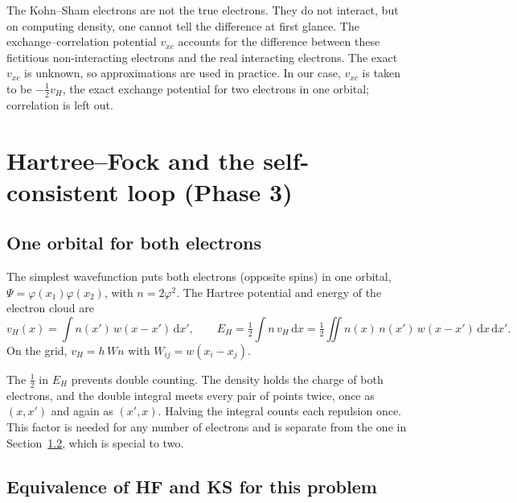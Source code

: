 \documentclass[11pt,a4paper]{article}
\newcommand{\dd}{\,\mathrm{d}}
\begin{document}
\begin{Note}
The Kohn--Sham electrons are not the true electrons. They do not interact, but on computing density, one cannot tell the difference at first glance.
The exchange--correlation potential $v_{xc}$ accounts for the difference between these fictitious non-interacting electrons and the real interacting
electrons. The exact $v_{xc}$ is unknown, so approximations are used in practice. In our case, $v_{xc}$ is taken to be $-\tfrac12v_H$, the exact
exchange potential for two electrons in one orbital; correlation is left out.
\end{Note}

\section{Hartree--Fock and the self-consistent loop (Phase 3)}

\subsection{One orbital for both electrons}

The simplest wavefunction puts both electrons (opposite spins) in one orbital, $\Psi=\varphi(x_1)\varphi(x_2)$, with
$n=2\varphi^2$. The Hartree potential and energy of the electron cloud are
\begin{equation}
  v_H(x)=\int n(x')\,w(x-x')\dd x',\qquad E_H=\tfrac12\int n\,v_H\dd x=\tfrac12\iint n(x)\,n(x')\,w(x-x')\dd x\dd x'.
\end{equation}
On the grid, $v_H=h\,Wn$ with $W_{ij}=w(x_i-x_j)$.

The $\tfrac12$ in $E_H$ prevents double counting. The density holds the charge of both electrons, and the double
integral meets every pair of points twice, once as $(x,x')$ and again as $(x',x)$. Halving the integral counts
each repulsion once. This factor is needed for any number of electrons and is separate from the one in
Section~\ref{sec:equiv}, which is special to two.

\subsection{Equivalence of HF and KS for this problem}\label{sec:equiv}
\end{document}
